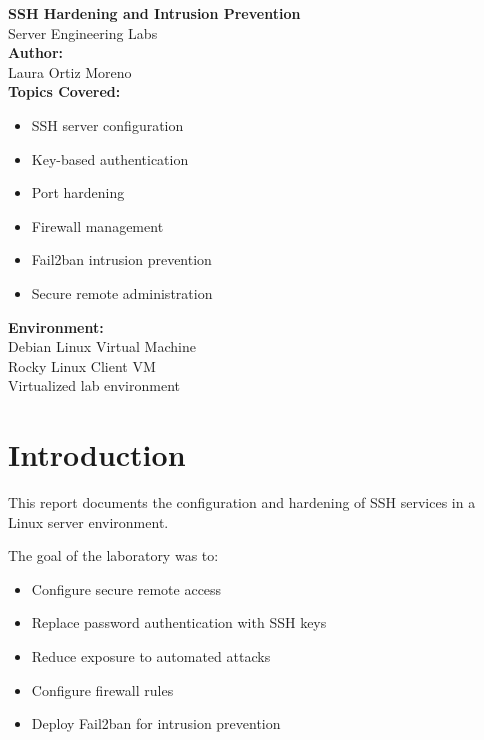 \documentclass[11pt,a4paper]{article}
\begin{document}
\begin{titlepage}
    \centering

    \vspace*{3cm}

    {\Huge \textbf{SSH Hardening and Intrusion Prevention}}\\[1cm]

    {\Large Server Engineering Labs}\\[2cm]

    \textbf{Author:}\\
    Laura Ortiz Moreno\\[1cm]

    \textbf{Topics Covered:}
    \begin{itemize}[leftmargin=4cm]
        \item SSH server configuration
        \item Key-based authentication
        \item Port hardening
        \item Firewall management
        \item Fail2ban intrusion prevention
        \item Secure remote administration
    \end{itemize}

    \vfill

    \textbf{Environment:}\\
    Debian Linux Virtual Machine\\
    Rocky Linux Client VM\\
    Virtualized lab environment

    \vspace{1cm}

\end{titlepage}

\tableofcontents
\newpage

\section{Introduction}

This report documents the configuration and hardening of SSH services in a Linux server environment.

The goal of the laboratory was to:
\begin{itemize}
    \item Configure secure remote access
    \item Replace password authentication with SSH keys
    \item Reduce exposure to automated attacks
    \item Configure firewall rules
    \item Deploy Fail2ban for intrusion prevention
\end{itemize}
\end{document}
